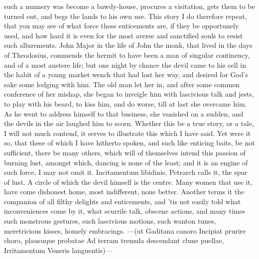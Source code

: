 {such a nunnery was become a bawdy-house, procures a visitation, gets
them to be turned out, and begs the lands to his own use. This story I
do therefore repeat, that you may see of what force these enticements
are, if they be opportunely used, and how hard it is even for the most
averse and sanctified souls to resist such allurements. John Major in
the life of John the monk, that lived in the days of Theodosius,
commends the hermit to have been a man of singular continency, and of a
most austere life; but one night by chance the devil came to his cell
in the habit of a young market wench that had lost her way, and desired
for God's sake some lodging with him. The old man let her in, and
after some common conference of her mishap, she began to inveigle him
with lascivious talk and jests, to play with his beard, to kiss him,
and do worse, till at last she overcame him. As he went to address
himself to that business, she vanished on a sudden, and the devils in
the air laughed him to scorn. Whether this be a true story, or a tale,
I will not much contend, it serves to illustrate this which I have
said.
Yet were it so, that these of which I have hitherto spoken, and such
like enticing baits, be not sufficient, there be many others, which
will of themselves intend this passion of burning lust, amongst which,
dancing is none of the least; and it is an engine of such force, I may
not omit it. Incitamentum libidinis, Petrarch calls it, the spur of
lust. A  circle of which the devil himself is the centre.
Many women that use it, have come dishonest home, most
indifferent, none better.  Another terms it the companion of all
filthy delights and enticements, and 'tis not easily told what
inconveniences come by it, what scurrile talk, obscene actions, and
many times such monstrous gestures, such lascivious motions, such
wanton tunes, meretricious kisses, homely embracings.
---(ut Gaditana canoro
Incipiat prurire choro, plausuque probatae
Ad terram tremula descendant clune puellae,
Irritamentum Veneris languentis)---

}
